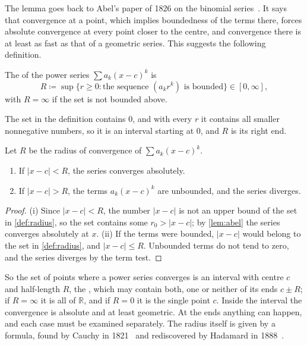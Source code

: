 The lemma goes back to Abel's paper of 1826 on the binomial series~\cite{abel1826}. It says that convergence at a point, which implies boundedness of the terms there, forces absolute convergence at every point closer to the centre, and convergence there is at least as fast as that of a geometric series. This suggests the following definition.

\begin{definition}
\label{def:radius}
The  of the power series $\sum a_k(x-c)^k$ is
\[
R\coloneqq\sup\bigl\{r\ge0: \text{the sequence }(a_kr^k)\text{ is bounded}\bigr\}\in[0,\infty],
\]
with $R=\infty$ if the set is not bounded above.
\end{definition}

The set in the definition contains $0$, and with every $r$ it contains all smaller nonnegative numbers, so it is an interval starting at $0$, and $R$ is its right end.

\begin{theorem}
\label{thm:radius}
Let $R$ be the radius of convergence of $\sum a_k(x-c)^k$.
\begin{enumerate}
\item If $|x-c|<R$, the series converges absolutely.
\item If $|x-c|>R$, the terms $a_k(x-c)^k$ are unbounded, and the series diverges.
\end{enumerate}
\end{theorem}

\begin{proof}
(i) Since $|x-c|<R$, the number $|x-c|$ is not an upper bound of the set in \cref{def:radius}, so the set contains some $r_0>|x-c|$; by \cref{lem:abel} the series converges absolutely at $x$. (ii) If the terms were bounded, $|x-c|$ would belong to the set in \cref{def:radius}, and $|x-c|\le R$. Unbounded terms do not tend to zero, and the series diverges by the term test.
\end{proof}

So the set of points where a power series converges is an interval with centre $c$ and half-length $R$, the , which may contain both, one or neither of its ends $c\pm R$; if $R=\infty$ it is all of $\mathbb R$, and if $R=0$ it is the single point $c$. Inside the interval the convergence is absolute and at least geometric. At the ends anything can happen, and each case must be examined separately. The radius itself is given by a formula, found by Cauchy in 1821~\cite{cauchy1821} and rediscovered by Hadamard in 1888~\cite{hadamard1888}.


